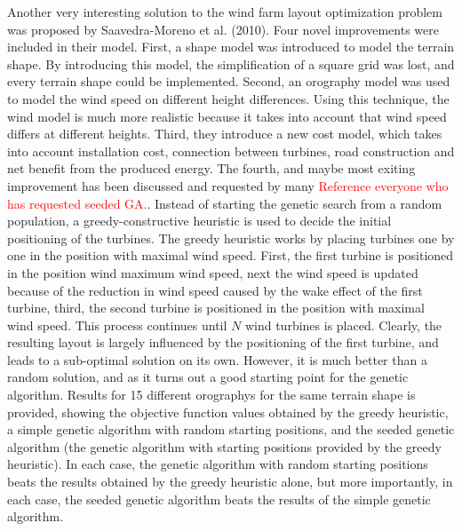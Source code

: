 

\noindent Another very interesting solution to the wind farm layout optimization problem was proposed by Saavedra-Moreno et al. (2010). Four novel improvements were included in their model. First, a shape model was introduced to model the terrain shape. By introducing this model, the simplification of a square grid was lost, and every terrain shape could be implemented. Second, an orography model was used to model the wind speed on different height differences. Using this technique, the wind model is much more realistic because it takes into account that wind speed differs at different heights. Third, they introduce a new cost model, which takes into account installation cost, connection between turbines, road construction and net benefit from the produced energy. The fourth, and maybe most exiting improvement has been discussed and requested by many \textcolor{red}{Reference everyone who has requested seeded GA.}. Instead of starting the genetic search from a random population, a greedy-constructive heuristic is used to decide the initial positioning of the turbines. The greedy heuristic works by placing turbines one by one in the position with maximal wind speed. First, the first turbine is positioned in the position wind maximum wind speed, next the wind speed is updated because of the reduction in wind speed caused by the wake effect of the first turbine, third, the second turbine is positioned in the position with maximal wind speed. This process continues until $N$ wind turbines is placed. Clearly, the resulting layout is largely influenced by the positioning of the first turbine, and leads to a sub-optimal solution on its own. However, it is much better than a random solution, and as it turns out a good starting point for the genetic algorithm. Results for 15 different orographys for the same terrain shape is provided, showing the objective function values obtained by the greedy heuristic, a simple genetic algorithm with random starting positions, and the seeded genetic algorithm (the genetic algorithm with starting positions provided by the greedy heuristic). In each case, the genetic algorithm with random starting positions beats the results obtained by the greedy heuristic alone, but more importantly, in each case, the seeded genetic algorithm beats the results of the simple genetic algorithm. \\


